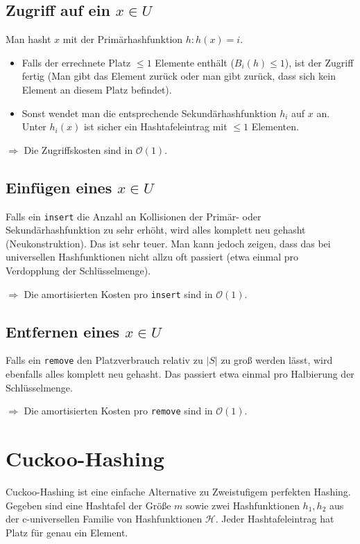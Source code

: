 \documentclass{scrartcl}%
\begin{document}
    \subsection*{Zugriff auf ein $x \in U$}
    Man hasht $x$ mit der Primärhashfunktion $h: h(x)=i$.
    \begin{itemize}
        \item Falls der errechnete Platz $\leq 1$ Elemente enthält ($B_i(h)\leq1$), ist der Zugriff fertig (Man gibt das Element zurück oder man gibt zurück, dass sich kein Element an diesem Platz befindet).
        \item Sonst wendet man die entsprechende Sekundärhashfunktion $h_i$ auf $x$ an. Unter $h_i(x)$ ist sicher ein Hashtafeleintrag mit $\leq1$ Elementen.
    \end{itemize}
    $\Rightarrow$ Die Zugriffskosten sind in $\mathcal{O}(1)$.

    \subsection*{Einfügen eines $x \in U$}
    Falls ein \texttt{insert} die Anzahl an Kollisionen der Primär- oder Sekundärhashfunktion zu sehr erhöht, wird alles komplett neu gehasht (Neukonstruktion).
    Das ist sehr teuer. Man kann jedoch zeigen, dass das bei universellen Hashfunktionen nicht allzu oft passiert (etwa einmal pro Verdopplung der Schlüsselmenge).

    $\Rightarrow$ Die amortisierten Kosten pro \texttt{insert} sind in $\mathcal{O}(1)$.

    \subsection*{Entfernen eines $x \in U$}
    Falls ein \texttt{remove} den Platzverbrauch relativ zu $|S|$ zu groß werden lässt, wird ebenfalls alles komplett neu gehasht. Das passiert etwa einmal pro Halbierung der Schlüsselmenge.

    $\Rightarrow$ Die amortisierten Kosten pro \texttt{remove} sind in $\mathcal{O}(1)$.

    \newpage
    \section*{Cuckoo-Hashing}
    Cuckoo-Hashing ist eine einfache Alternative zu Zweistufigem perfekten Hashing. Gegeben sind eine Hashtafel der Größe $m$
    sowie zwei Hashfunktionen $h_1,h_2$ aus der c-universellen Familie von Hashfunktionen $\mathcal{H}$.
    Jeder Hashtafeleintrag hat Platz für genau ein Element.
\end{document}
